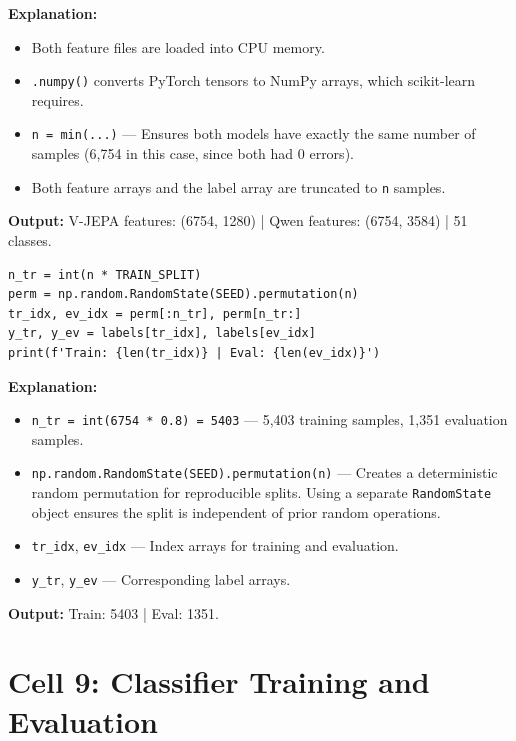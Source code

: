 \documentclass[a4paper, 12pt]{article}
\newenvironment{explanation}{%
  \par\smallskip
  \noindent\textcolor{blue!70!black}{\textbf{Explanation:}}\\
  \noindent
}{\par\medskip}
\begin{document}
\begin{explanation}
\begin{itemize}[nosep]
  \item Both feature files are loaded into CPU memory.
  \item \texttt{.numpy()} converts PyTorch tensors to NumPy arrays, which scikit-learn requires.
  \item \texttt{n = min(...)} --- Ensures both models have exactly the same number of samples (6,754 in this case, since both had 0 errors).
  \item Both feature arrays and the label array are truncated to \texttt{n} samples.
\end{itemize}
\textbf{Output:} V-JEPA features: (6754, 1280) | Qwen features: (6754, 3584) | 51 classes.
\end{explanation}

\begin{lstlisting}
n_tr = int(n * TRAIN_SPLIT)
perm = np.random.RandomState(SEED).permutation(n)
tr_idx, ev_idx = perm[:n_tr], perm[n_tr:]
y_tr, y_ev = labels[tr_idx], labels[ev_idx]
print(f'Train: {len(tr_idx)} | Eval: {len(ev_idx)}')
\end{lstlisting}

\begin{explanation}
\begin{itemize}[nosep]
  \item \texttt{n\_tr = int(6754 * 0.8) = 5403} --- 5,403 training samples, 1,351 evaluation samples.
  \item \texttt{np.random.RandomState(SEED).permutation(n)} --- Creates a deterministic random permutation for reproducible splits. Using a separate \texttt{RandomState} object ensures the split is independent of prior random operations.
  \item \texttt{tr\_idx}, \texttt{ev\_idx} --- Index arrays for training and evaluation.
  \item \texttt{y\_tr}, \texttt{y\_ev} --- Corresponding label arrays.
\end{itemize}
\textbf{Output:} Train: 5403 | Eval: 1351.
\end{explanation}

\newpage
\section{Cell 9: Classifier Training and Evaluation}
\end{document}
